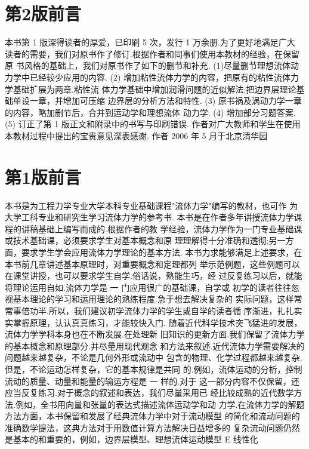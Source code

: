\chapter*{第2版前言}
本书第 1 版深得读者的厚爱，已印刷 5 次，发行 1 万余册.为了更好地满足广大 读者的需要，我们对原书作了修订.根据作者和同事们使用本教材的经验，在保留原 书风格的基础上，我们对原书作了如下的删节和补充. (1)尽量删节理想流体动力学中已经较少应用的内容. (2) 增加粘性流体力学的内容，把原有的粘性流体力学基础扩展为两章.粘性流 体力学基础中增加润滑问题的近似解法:把边界层理论基础单设一章，并增加可压缩 边界层的分析方法和特性. (3) 原书祸及涡动力学一章的内容，略加删节后，合并到运动学和理想流体 动力学. (4) 增加部分习题答案. (5) 订正了第 1 版正文和附录中的书写与印刷错误. 作者对广大教师和学生在使用本教材过程中提出的宝贵意见深表感谢. 作者 2006 年 5 月于北京清华园

\chapter*{第1版前言}
本书是为工程力学专业大学本科专业基础课程"流体力学"编写的教材，也可作 为大学工科专业和研究生学习流体力学的参考书. 本书是在作者多年讲授流体力学课程的讲稿基础上编写而成的.根据作者的教 学经验，流体力学作为一门专业基础课或技术基础课，必须要求学生对基本概念和原 理理解得十分准确和透彻;另一方面，要求学生学会应用流体力学理论的基本方法. 本书力求能够满足上述要求，在本书前几章讲述基本原理时，对重要概念和定理都列 举示范例题，这些例题可以在课堂讲授，也可以要求学生自学.俗话说，熟能生巧，经 过反复练习以后，就能将理论运用自如.流体力学是 一 门应用很广的基础课，自学或 初学的读者往往忽视基本理论的学习和运用理论的熟练程度.急于想去解决复杂的 实际问题，这样常常事倍功半.所以，我们建议初学流体力学的学生或自学的读者循 序渐进，扎扎实实掌握原理，认认真真练习，才能较快入门. 随着近代科学技术突飞猛进的发展，流体力学学科本身也在不断发展.在处理新 旧知识的更新方面.我们保留了流体力学的基本概念和原理部分.并尽量用现代观念 和方法来叙述.近代流体力学需要解决的问题越来越复杂，不论是几何外形或流动中 包含的物理、化学过程都越来越复杂.但是，不论运动怎样复杂，它的基本规律是共同 的.例如，流体运动的分析，控制流动的质量、动量和能量的输运方程是 一 样的.对于 这一部分内容不仅保留，还应当反复练习.对于概念的叙述和表达，我们尽量采用已 经比较成熟的近代数学方法.例如，全书用向量和张量的表达式描述流体运动学和动 力学.在流体力学的解题方法方面，本书保留和发展了经典流体力学中对于流动模型 的简化和流动问题的准确数学提法，这典方法对于用数值计算方法解决日益增多的 复杂流动问题仍然是基本的和重要的，例如，边界层模型、理想流体运动模型 E 线性化

